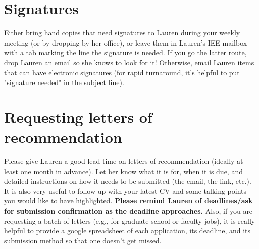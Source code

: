 \documentclass[12pt]{article}
\begin{document}
\section{Signatures}
Either bring hand copies that need signatures to Lauren during your weekly meeting (or by dropping by her office), or leave them in Lauren's IEE mailbox with a tab marking the line the signature is needed. If you go the latter route, drop Lauren an email so she knows to look for it! Otherwise, email Lauren items that can have electronic signatures (for rapid turnaround, it's helpful to put "signature needed" in the subject line).

\section{Requesting letters of recommendation}
Please give Lauren a good lead time on letters of recommendation (ideally at least one month in advance). Let her know what it is for, when it is due, and detailed instructions on how it needs to be submitted (the email, the link, etc.). It is also very useful to follow up with your latest CV and some talking points you would like to have highlighted. \textbf{Please remind Lauren of deadlines/ask for submission confirmation as the deadline approaches.} Also, if you are requesting a batch of letters (e.g., for graduate school or faculty jobs), it is really helpful to provide a google spreadsheet of each application, its deadline, and its submission method so that one doesn't get missed.
\end{document}
